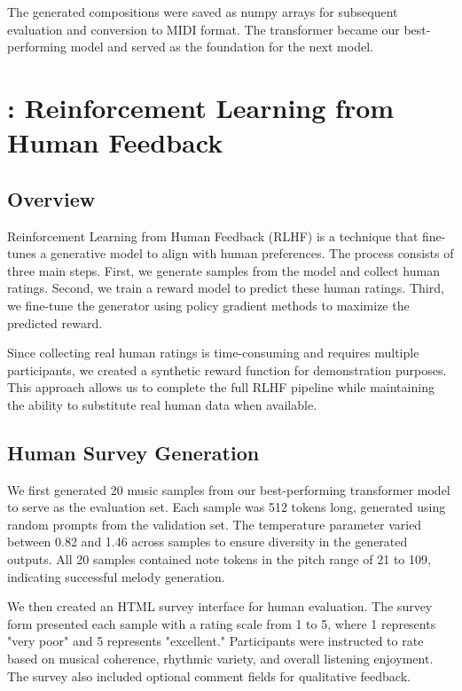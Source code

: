 \documentclass{article}
\theoremstyle{plain}
\theoremstyle{definition}
\theoremstyle{remark}
\begin{document}
The generated compositions were saved as numpy arrays for subsequent evaluation and conversion to MIDI format. The transformer became our best-performing model and served as the foundation for the next model.



\section{: Reinforcement Learning from Human Feedback}

\subsection{Overview}

Reinforcement Learning from Human Feedback (RLHF) is a technique that fine-tunes a generative model to align with human preferences. The process consists of three main steps. First, we generate samples from the model and collect human ratings. Second, we train a reward model to predict these human ratings. Third, we fine-tune the generator using policy gradient methods to maximize the predicted reward.

Since collecting real human ratings is time-consuming and requires multiple participants, we created a synthetic reward function for demonstration purposes. This approach allows us to complete the full RLHF pipeline while maintaining the ability to substitute real human data when available.

\subsection{Human Survey Generation}

We first generated 20 music samples from our best-performing transformer model to serve as the evaluation set. Each sample was 512 tokens long, generated using random prompts from the validation set. The temperature parameter varied between 0.82 and 1.46 across samples to ensure diversity in the generated outputs. All 20 samples contained note tokens in the pitch range of 21 to 109, indicating successful melody generation.

We then created an HTML survey interface for human evaluation. The survey form presented each sample with a rating scale from 1 to 5, where 1 represents "very poor" and 5 represents "excellent." Participants were instructed to rate based on musical coherence, rhythmic variety, and overall listening enjoyment. The survey also included optional comment fields for qualitative feedback.
\end{document}
